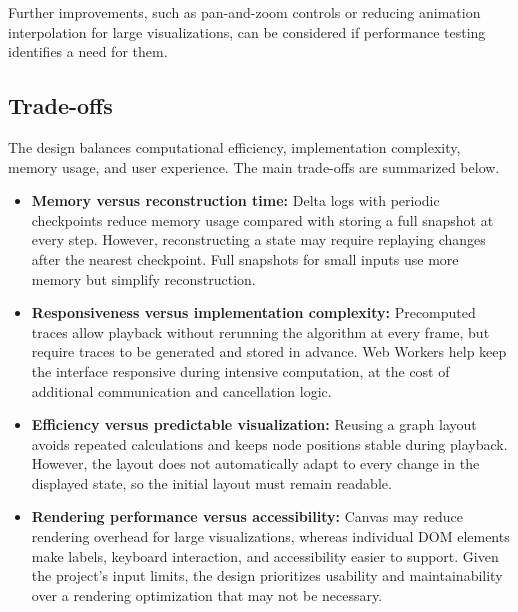 \documentclass[11pt,a4paper]{article}
\begin{document}
Further improvements, such as pan-and-zoom controls or reducing
animation interpolation for large visualizations, can be
considered if performance testing identifies a need for them.





\subsection{Trade-offs}

The design balances computational efficiency, implementation
complexity, memory usage, and user experience. The main
trade-offs are summarized below.

\begin{itemize}
    \item \textbf{Memory versus reconstruction time:}
    Delta logs with periodic checkpoints reduce memory usage
    compared with storing a full snapshot at every step.
    However, reconstructing a state may require replaying
    changes after the nearest checkpoint. Full snapshots for
    small inputs use more memory but simplify reconstruction.

    \item \textbf{Responsiveness versus implementation complexity:}
    Precomputed traces allow playback without rerunning the
    algorithm at every frame, but require traces to be generated
    and stored in advance. Web Workers help keep the interface
    responsive during intensive computation, at the cost of
    additional communication and cancellation logic.

    \item \textbf{Efficiency versus predictable visualization:}
    Reusing a graph layout avoids repeated calculations and
    keeps node positions stable during playback. However, the
    layout does not automatically adapt to every change in the
    displayed state, so the initial layout must remain readable.

    \item \textbf{Rendering performance versus accessibility:}
    Canvas may reduce rendering overhead for large visualizations,
    whereas individual DOM elements make labels, keyboard
    interaction, and accessibility easier to support. Given the
    project's input limits, the design prioritizes usability
    and maintainability over a rendering optimization that may
    not be necessary.

\end{itemize}
\end{document}
